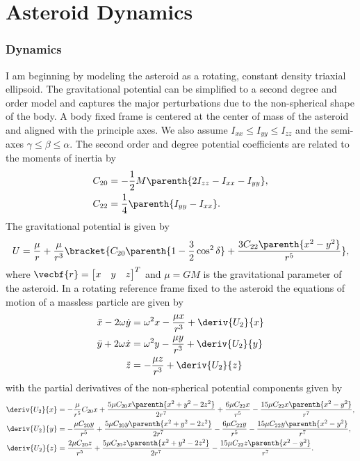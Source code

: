 
\chapter{Asteroid Dynamics}
\subsection*{Dynamics}

I am beginning by modeling the asteroid as a rotating, constant density triaxial ellipsoid. 
The gravitational potential can be simplified to a second degree and order model and captures the major perturbations due to the non-spherical shape of the body.
A body fixed frame is centered at the center of mass of the asteroid and aligned with the principle axes. 
We also assume \( I_{xx} \leq I_{yy} \leq I_{zz} \) and the semi-axes \( \gamma \leq \beta \leq \alpha \).
The second order and degree potential coefficients are related to the moments of inertia by 
\begin{align*}
	C_{20} &= -\frac{1}{2} M \parenth{2 I_{zz} - I_{xx} - I_{yy}} , \\
	C_{22} &=  \frac{1}{4} \parenth{I_{yy} - I_{xx}} .
\end{align*}
The gravitational potential is given by
\begin{align*}
	U = \frac{\mu}{r} + \frac{\mu}{r^3} \bracket{C_{20} \parenth{1-\frac{3}{2} \cos^2 \delta} + \frac{3 C_{22} \parenth{x^2 - y^2}}{r^5} } ,
\end{align*}
where \( \vecbf{r} = \begin{bmatrix} x & y & z \end{bmatrix}^T \) and \( \mu = G M \) is the gravitational parameter of the asteroid.
In a rotating reference frame fixed to the asteroid the equations of motion of a massless particle are given by
\begin{align*}
	\ddot{x} - 2 \omega \dot{y} &= \omega^2 x - \frac{\mu x}{r^3} + \deriv{U_2}{x} \\
	\ddot{y} + 2 \omega \dot{x} &= \omega^2 y - \frac{\mu y}{r^3} + \deriv{U_2}{y} \\
	\ddot{z} &= -\frac{\mu z}{r^3} + \deriv{U_2}{z} 
\end{align*}
with the partial derivatives of the non-spherical potential components given by
\begin{align*}
	\deriv{U_2}{x} &= -\frac{\mu}{r^5} C_{20} x + \frac{5 \mu C_{20} x \parenth{x^2 + y^2 - 2 z^2}}{2 r^7} + \frac{6 \mu C_{22}x}{r^5} - \frac{15 \mu C_{22} x \parenth{x^2 - y^2}}{r^7} , \\
	\deriv{U_2}{y} &= -\frac{\mu C_{20} y}{r^5} + \frac{5 \mu C_{20} y \parenth{x^2+y^2-2z^2}}{2 r^7} - \frac{6 \mu C_{22}y}{r^5} - \frac{15 \mu C_{22} y \parenth{x^2 - y^2}}{r^7}, \\
	\deriv{U_2}{z} &= \frac{2 \mu C_{20} z}{r^5} + \frac{5 \mu C_{20} z \parenth{x^2 + y^2 - 2 z^2}}{2 r^7} - \frac{15 \mu C_{22} z \parenth{x^2-y^2}}{r^7}.
\end{align*}
